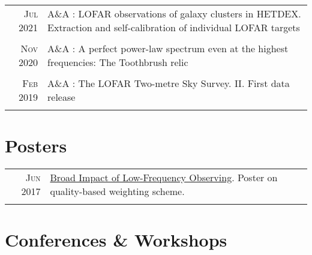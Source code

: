 \documentclass[11pt,a4paper,notitlepage]{article}
\begin{document}
\begin{tabular}{r|p{12.5cm}}

	
	\textsc{Jul 2021} & A\&A : LOFAR observations of galaxy clusters in HETDEX. Extraction and self-calibration of individual LOFAR targets \citep{2021AA...651A.115V} \\
	\multicolumn{2}{c}{} \\
	
	\textsc{Nov 2020} & A\&A : A perfect power-law spectrum even at the highest frequencies: The Toothbrush relic\citep{2020AA...642L..13R} \\
	\multicolumn{2}{c}{} \\
%	
	
	\textsc{Feb 2019} & A\&A : The LOFAR Two-metre Sky Survey. II. First data release \citep{2019AA...622A...1S} \\
	\multicolumn{2}{c}{} \\
	
\end{tabular}


\section{Posters}

\begin{tabular}{r|p{12.5cm}}
	\textsc{Jun 2017} & \href{https://www.radionet-org.eu/radionet/the-broad-impact-of-low-frequency-observing/}{Broad Impact of Low-Frequency Observing}. Poster on quality-based weighting scheme.\\
	\multicolumn{2}{c}{} \\
\end{tabular}

\section{Conferences \& Workshops}
\end{document}
